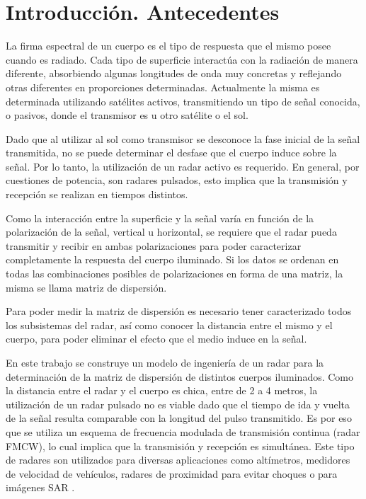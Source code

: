 \chapter{Introducción. Antecedentes} \label{ch:introduction}


La firma espectral de un cuerpo es el tipo de respuesta que el mismo posee cuando es radiado. Cada tipo de superficie interactúa con la radiación de manera diferente, absorbiendo algunas longitudes de onda muy concretas y reflejando otras diferentes en proporciones determinadas. Actualmente la misma es determinada utilizando satélites activos, transmitiendo un tipo de señal conocida, o pasivos, donde el transmisor es u otro satélite o el sol. 

Dado que al utilizar al sol como transmisor se desconoce la fase inicial de la señal transmitida, no se puede determinar el desfase que el cuerpo induce sobre la señal. Por lo tanto, la utilización de un radar activo es requerido. En general, por cuestiones de potencia, son radares pulsados, esto implica que la transmisión y recepción se realizan en tiempos distintos.

Como la interacción entre la superficie y la señal varía en función de la polarización de la señal, vertical u horizontal, se requiere que el radar pueda transmitir y recibir en ambas polarizaciones para poder caracterizar completamente la respuesta del cuerpo iluminado. Si los datos se ordenan en todas las combinaciones posibles de polarizaciones en forma de una matriz, la misma se llama matriz de dispersión.

Para poder medir la matriz de dispersión es necesario tener caracterizado todos los subsistemas del radar, así como conocer la distancia entre el mismo y el cuerpo, para poder eliminar el efecto que el medio induce en la señal. 

En este trabajo se construye un modelo de ingeniería de un radar para la determinación de la matriz de dispersión de distintos cuerpos iluminados. Como la distancia entre el radar y el cuerpo es chica, entre de 2 a 4 metros, la utilización de un radar pulsado no es viable dado que el tiempo de ida y vuelta de la señal resulta comparable con la longitud del pulso transmitido. Es por eso que se utiliza un esquema de frecuencia modulada de transmisión continua (radar FMCW), lo cual implica que la transmisión y recepción es simultánea. Este tipo de radares son utilizados para diversas aplicaciones como altímetros, medidores de velocidad de vehículos, radares de proximidad para evitar choques o para imágenes SAR \cite{Richards2010}.

